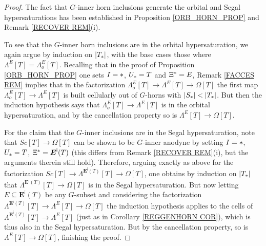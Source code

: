\documentclass[a4paper,10pt
,draft
]{article}%
\begin{document}
\begin{proof}
	The fact that $G$-inner horn inclusions generate the orbital and Segal hypersaturations has been established in Proposition \ref{ORB_HORN_PROP} and Remark \ref{RECOVER REM}(i).
	
	To see that the $G$-inner horn inclusions are in the orbital hypersaturation, we again argue by induction on $|T_{\**}|$, with the base cases those where $\Lambda^{E} [T]=\Lambda^{E}_o [T]$.
	Recalling that in the proof of Proposition \ref{ORB_HORN_PROP}
	one sets
	$I=\**$, $U_{\**} = T$ and $\Xi^{\**} = E$,
	Remark \ref{FACCES REM} implies that in the factorization
	$\Lambda_o^E[T] \to \Lambda^E[T] \to \Omega[T]$
	the first map $\Lambda_o^E[T] \to \Lambda^E[T]$ is built cellularly out of $G$-horns with $|S_{\**}| < |T_{\**}|$.
	But then the induction hypothesis says that 
	$\Lambda_o^E[T] \to \Lambda^E[T]$ is in the orbital hypersaturation, and by the cancellation property so is $\Lambda^E[T] \to \Omega[T]$.
	
	For the claim that the $G$-inner inclusions are in the Segal hypersaturation,
	note that $Sc[T] \to \Omega[T]$ can be shown to be $G$-inner anodyne by setting $I=\**$, $U_{\**} = T$, $\Xi^{\**} = \boldsymbol{E}^{\mathsf{i}}(T)$
	(this differs from Remark \ref{RECOVER REM}(i), but the arguments therein still hold).
	Therefore, arguing exactly as above for the factorization
	$Sc[T] \to \Lambda^{\boldsymbol{E}^{\mathsf{i}}(T)}[T] \to \Omega[T]$,
	one obtains by induction on $|T_{\**}|$ that
	$\Lambda^{\boldsymbol{E}^{\mathsf{i}}(T)}[T] \to \Omega[T]$
	is in the Segal hypersaturation. 
	But now letting $E \subseteq \boldsymbol{E}^{\mathsf{i}}(T)$ be any $G$-subset and considering the factorization
	$\Lambda^{\boldsymbol{E}^{\mathsf{i}}(T)}[T] \to 
	\Lambda^{E}[T] \to
	\Omega[T]$ the induction hypothesis applies to the cells of
	$\Lambda^{\boldsymbol{E}^{\mathsf{i}}(T)}[T] \to \Lambda^{E}[T]$
	(just as in Corollary \ref{REGGENHORN COR}),
	which is thus also in the Segal hypersaturation.
	But by the cancellation property, so is 
	$\Lambda^{E}[T] \to \Omega[T]$, finishing the proof.
\end{proof}
\end{document}

